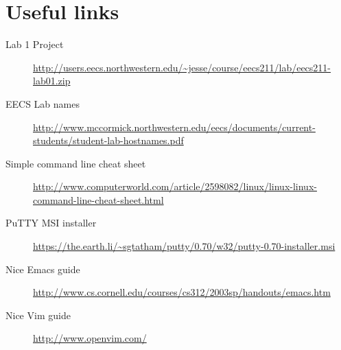 \documentclass{tufte-handout}
\def\PuTTYurl{https://the.earth.li/~sgtatham/putty/0.70/w32/putty-0.70-installer.msi}
\begin{document}
\section{Useful links}

\begin{description}

  \item[Lab 1 Project]
\url{http://users.eecs.northwestern.edu/~jesse/course/eecs211/lab/eecs211-lab01.zip}

\item[EECS Lab names]
\url{http://www.mccormick.northwestern.edu/eecs/documents/current-students/student-lab-hostnames.pdf}

\item[Simple command line cheat sheet]
\url{http://www.computerworld.com/article/2598082/linux/linux-linux-command-line-cheat-sheet.html}

\item[PuTTY MSI installer]
\url{\PuTTYurl}

\item[Nice Emacs guide]
\url{http://www.cs.cornell.edu/courses/cs312/2003sp/handouts/emacs.htm}

\item[Nice Vim guide]
\url{http://www.openvim.com/}

\end{description}
\end{document}
